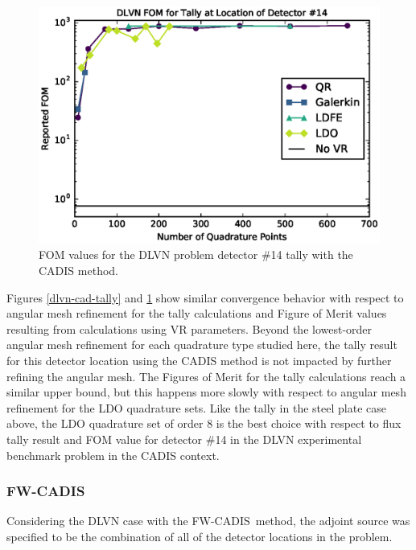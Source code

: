\documentclass{article} %
\newcommand{\fwc}{\mbox{FW-CADIS}}
\begin{document}
\begin{figure}[!htb]
\centering
\includegraphics[max height=0.445\textheight]{dlvn-cadis-fom.eps}
\caption{FOM values for the DLVN problem detector \#14 tally with the CADIS 
         method.}
\label{dlvn-cad-fom}
\end{figure}

Figures \ref{dlvn-cad-tally} and \ref{dlvn-cad-fom} show similar convergence
behavior with respect to angular mesh refinement for the tally calculations
and Figure of Merit values resulting from calculations using VR parameters.
Beyond the lowest-order angular mesh refinement for each quadrature type
studied here, the tally result for this detector location using the CADIS
method is not impacted by further refining the angular mesh. The Figures of
Merit for the tally calculations reach a similar upper bound, but this happens
more slowly with respect to angular mesh refinement for the LDO quadrature
sets. Like the tally in the steel plate case above, the LDO quadrature set of
order 8 is the best choice with respect to flux tally result and FOM value for
detector \#14 in the DLVN experimental benchmark problem in the CADIS context.

\FloatBarrier
\subsubsection{\fwc}

Considering the DLVN case with the \fwc\ method, the adjoint source was
specified to be the combination of all of the detector locations in the
problem.
\end{document}

